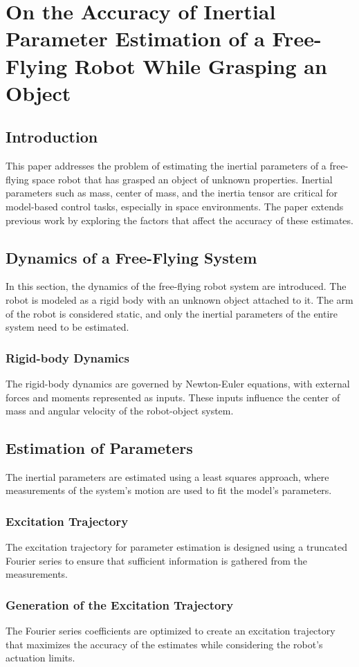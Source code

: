 \documentclass[a4paper,12pt]{article}
\begin{document}
\section{On the Accuracy of Inertial Parameter Estimation of a Free-Flying
  Robot While Grasping an Object}


\subsection{Introduction}
This paper addresses the problem of estimating the inertial parameters of a free-flying space robot that has grasped an object of unknown properties. Inertial parameters such as mass, center of mass, and the inertia tensor are critical for model-based control tasks, especially in space environments. The paper extends previous work by exploring the factors that affect the accuracy of these estimates.

\subsection{Dynamics of a Free-Flying System}
In this section, the dynamics of the free-flying robot system are introduced. The robot is modeled as a rigid body with an unknown object attached to it. The arm of the robot is considered static, and only the inertial parameters of the entire system need to be estimated.
\subsubsection{Rigid-body Dynamics}
The rigid-body dynamics are governed by Newton-Euler equations, with external forces and moments represented as inputs. These inputs influence the center of mass and angular velocity of the robot-object system.

\subsection{Estimation of Parameters}
The inertial parameters are estimated using a least squares approach, where measurements of the system's motion are used to fit the model's parameters.
\subsubsection{Excitation Trajectory}
The excitation trajectory for parameter estimation is designed using a truncated Fourier series to ensure that sufficient information is gathered from the measurements.
\subsubsection{Generation of the Excitation Trajectory}
The Fourier series coefficients are optimized to create an excitation trajectory that maximizes the accuracy of the estimates while considering the robot's actuation limits.
\end{document}
